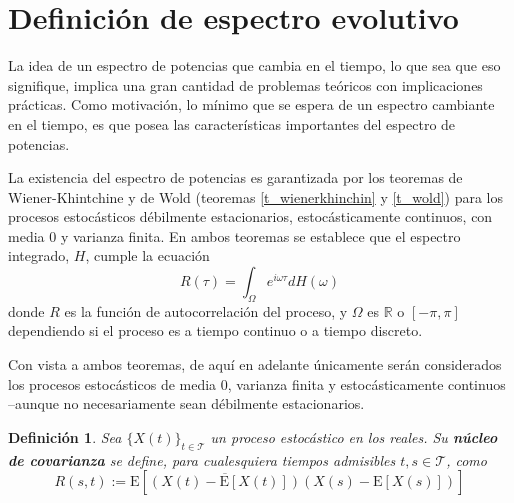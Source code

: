 \documentclass[12pt,letterpaper]{book}
\newtheorem{definicion}{Definición}[chapter]
\newcommand{\R}{\mathbb{R}}
\newcommand{\E}[1]{\mathrm{E}\left[ #1 \right]}
\newcommand{\xt}{$\{X(t)\}_{t\in \mathcal{T}}$ }
\begin{document}

\section{Definición de espectro evolutivo}
\label{sec:espectro}

La idea de un espectro de potencias que cambia en el tiempo, lo que sea que eso signifique, implica una gran cantidad de problemas teóricos con implicaciones prácticas.
%
Como motivación, lo mínimo que se espera de un espectro cambiante en el tiempo, es que posea las características importantes del espectro de potencias.

La existencia del espectro de potencias es garantizada por los teoremas de Wiener-Khintchine y de Wold (teoremas \ref{t_wienerkhinchin} y \ref{t_wold}) para los procesos estocásticos débilmente estacionarios, estocásticamente continuos, con media 0 y varianza finita.
%
En ambos teoremas se establece que el espectro integrado, $H$, cumple la ecuación
\begin{equation}
R(\tau) = \int_\Omega e^{i \omega \tau} dH(\omega)
\label{lazy1}
\end{equation}
donde $R$ es la función de autocorrelación del proceso, y $\Omega$ es $\R$ o $[-\pi,\pi]$ dependiendo si el proceso es a tiempo continuo o a tiempo discreto.

Con vista a ambos teoremas, de aquí en adelante únicamente serán considerados los procesos estocásticos de media 0, varianza finita y estocásticamente continuos --aunque no necesariamente sean débilmente estacionarios.

\begin{definicion}
Sea \xt un proceso estocástico en los reales. Su \textbf{núcleo de covarianza} se define, para cualesquiera tiempos admisibles $t,s\in\mathcal{T}$, como
\begin{equation}
R(s,t) := \E{\overline{\left( X(t)-\E{X(t)} \right)}\left( X(s)-\E{X(s)} \right)}
\end{equation}
\label{s6:kernel}
\end{definicion}
\end{document}
